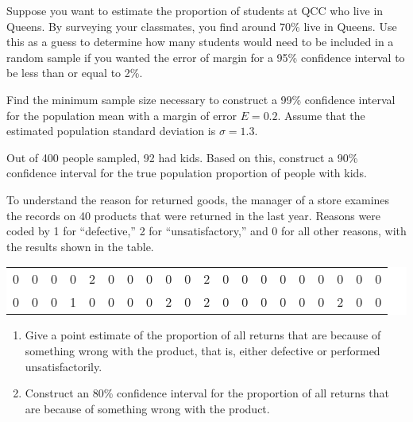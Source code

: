 \begin{example}

Suppose you want to estimate the proportion of students at QCC who live
in Queens. By surveying your classmates, you find around 70\% live in
Queens. Use this as a guess to determine how many students would need to
be included in a random sample if you wanted the error of margin for a
95\% confidence interval to be less than or equal to 2\%.

\end{example}
\vspace*{8\baselineskip}

\begin{example}

Find the minimum sample size necessary to construct a 99\% confidence
interval for the population mean with a margin of error \(E =0.2\).
Assume that the estimated population standard deviation is
\(\sigma=1.3\).

\end{example}
\vspace*{8\baselineskip}

\begin{exercise}

Out of 400 people sampled, 92 had kids. Based on this, construct a 90\%
confidence interval for the true population proportion of people with
kids.

\end{exercise}
\vspace*{8\baselineskip}

\begin{exercise}

To understand the reason for returned goods, the manager of a store
examines the records on 40 products that were returned in the last year.
Reasons were coded by 1 for ``defective,'' 2 for ``unsatisfactory,'' and
0 for all other reasons, with the results shown in the table.

\begin{fullwidth}
  \colorbox{white}{
    \parbox{\linewidth}{\raggedleft
      \begin{tabular}{*{20}{c}}
        0 & 0 & 0 & 0 & 2 & 0 & 0 & 0 & 0 & 0 & 2 & 0 & 0 & 0 & 0 & 0 & 0 & 0 & 0 & 0 \\
        0 & 0 & 0 & 1 & 0 & 0 & 0 & 0 & 2 & 0 & 2 & 0 & 0 & 0 & 0 & 0 & 0 & 2 & 0 & 0
      \end{tabular}
    }}
\end{fullwidth}

\begin{enumerate}
\item
  Give a point estimate of the proportion of all returns that are
  because of something wrong with the product, that is, either defective
  or performed unsatisfactorily.
\item
  Construct an 80\% confidence interval for the proportion of all
  returns that are because of something wrong with the product.
\end{enumerate}

\end{exercise}

